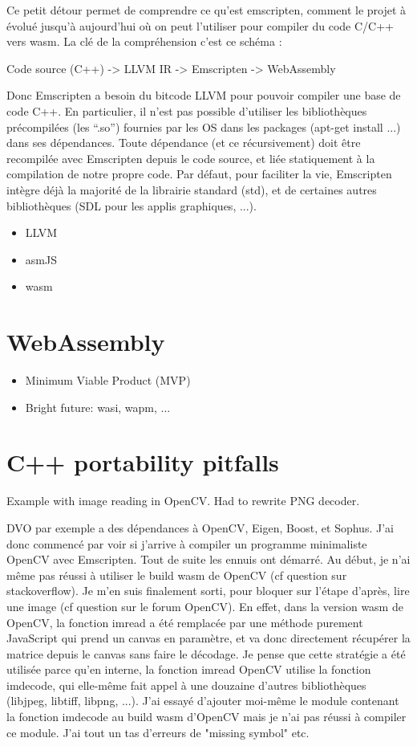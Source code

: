 Ce petit détour permet de comprendre ce qu’est emscripten, comment le projet à évolué jusqu’à aujourd’hui où on peut l’utiliser pour compiler du code C/C++ vers wasm. La clé de la compréhension c’est ce schéma :

Code source (C++) -> LLVM IR -> Emscripten -> WebAssembly

Donc Emscripten a besoin du bitcode LLVM pour pouvoir compiler une base de code C++. En particulier, il n’est pas possible d’utiliser les bibliothèques précompilées (les “.so”) fournies par les OS dans les packages (apt-get install ...) dans ses dépendances. Toute dépendance (et ce récursivement) doit être recompilée avec Emscripten depuis le code source, et liée statiquement à la compilation de notre propre code. Par défaut, pour faciliter la vie, Emscripten intègre déjà la majorité de la librairie standard (std), et de certaines autres bibliothèques (SDL pour les applis graphiques, ...).


\begin{itemize}
	\item LLVM
	\item asmJS
	\item wasm
\end{itemize}

\section{WebAssembly}%
\label{sec:WebAssembly}

\begin{itemize}
	\item Minimum Viable Product (MVP)
	\item Bright future: wasi, wapm, ...
\end{itemize}

\section{C++ portability pitfalls}%
\label{sec:cpp_pitfalls}

Example with image reading in OpenCV.
Had to rewrite PNG decoder.


DVO par exemple a des dépendances à OpenCV, Eigen, Boost, et Sophus. J’ai donc commencé par voir si j’arrive à compiler un programme minimaliste OpenCV avec Emscripten. Tout de suite les ennuis ont démarré. Au début, je n’ai même pas réussi à utiliser le build wasm de OpenCV (cf question sur stackoverflow). Je m’en suis finalement sorti, pour bloquer sur l’étape d’après, lire une image (cf question sur le forum OpenCV). En effet, dans la version wasm de OpenCV, la fonction imread a été remplacée par une méthode purement JavaScript qui prend un canvas en paramètre, et va donc directement récupérer la matrice depuis le canvas sans faire le décodage. Je pense que cette stratégie a été utilisée parce qu’en interne, la fonction imread OpenCV utilise la fonction imdecode, qui elle-même fait appel à une douzaine d’autres bibliothèques (libjpeg, libtiff, libpng, ...). J’ai essayé d’ajouter moi-même le module contenant la fonction imdecode au build wasm d’OpenCV mais je n’ai pas réussi à compiler ce module. J’ai tout un tas d’erreurs de "missing symbol" etc.

